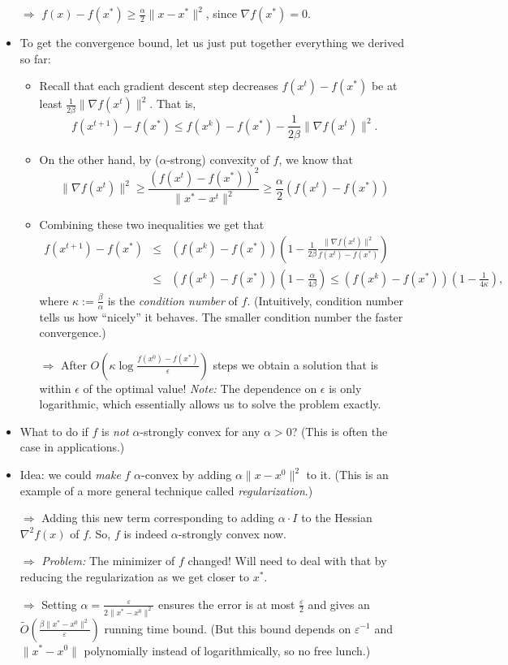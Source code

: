 \documentclass{article}
\begin{document}
\begin{itemize}
$\Rightarrow$ $f(x)-f(x^*)\geq \frac{\alpha}{2}\|x-x^*\|^2$, since $\nabla f(x^*)=0$.
\item To get the convergence bound, let us just put together everything we derived so far: 
\begin{itemize}
\item Recall that each gradient descent step decreases $f(x^t)-f(x^*)$ be at least $\frac{1}{2\beta}\|\nabla f(x^t)\|^2$. That is, 
\[
f(x^{t+1})-f(x^*)\leq f(x^k)-f(x^*)-\frac{1}{2\beta}\|\nabla f(x^t)\|^2.
\]
\item On the other hand, by ($\alpha$-strong) convexity of $f$, we know that
\[
\|\nabla f(x^t)\|^2\geq  \frac{(f(x^t)-f(x^*))^2}{\|x^*-x^t\|^2}\geq \frac{\alpha}{2} \left(f(x^t)-f(x^*)\right)
\]
\item Combining these two inequalities we get that
\begin{eqnarray*}
f(x^{t+1})-f(x^*) &\leq  &\left(f(x^k)-f(x^*)\right)\left(1-\frac{1}{2\beta}\frac{\|\nabla f(x^t)\|^2}{f(x^t)-f(x^*)}\right)\\
&\leq & \left(f(x^k)-f(x^*)\right)\left(1-\frac{\alpha}{4\beta}\right)\leq \left(f(x^k)-f(x^*)\right)\left(1-\frac{1}{4\kappa}\right),
\end{eqnarray*}
where $\kappa:=\frac{\beta}{\alpha}$ is the {\em condition number} of $f$. (Intuitively, condition number tells us how ``nicely'' it behaves. The smaller condition number the faster convergence.)

$\Rightarrow$ After $O(\kappa \log \frac{f(x^0)-f(x^*)}{\epsilon})$ steps we obtain a solution that is within $\epsilon$ of the optimal value! {\em Note:} The dependence on $\epsilon$ is only logarithmic, which essentially allows us to solve the problem exactly.  
\end{itemize}
\item What to do if $f$ is {\em not} $\alpha$-strongly convex for any $\alpha>0$? (This is often the case in applications.)
\item Idea: we could {\em make} $f$ $\alpha$-convex by adding $\alpha\|x-x^0\|^2$ to it. (This is an example of a more general technique called {\em regularization}.)

$\Rightarrow$ Adding this new term corresponding to adding $\alpha \cdot I$ to the Hessian $\nabla^2 f(x)$ of $f$. So, $f$ is indeed $\alpha$-strongly convex now. 

$\Rightarrow$ {\em Problem:} The minimizer of $f$ changed! Will need to deal with that by reducing the regularization as we get closer to $x^*$. 

$\Rightarrow$ Setting $\alpha=\frac{\varepsilon}{2\|x^*-x^0\|^2}$ ensures the error is at most $\frac{\varepsilon}{2}$ and gives an $\widetilde{O}\left(\frac{\beta \|x^*-x^0\|^2}{\varepsilon}\right)$ running time bound. (But this bound depends on $\varepsilon^{-1}$ and $\|x^*-x^0\|$ polynomially instead of logarithmically, so no free lunch.) 
\end{itemize}
\end{document}
